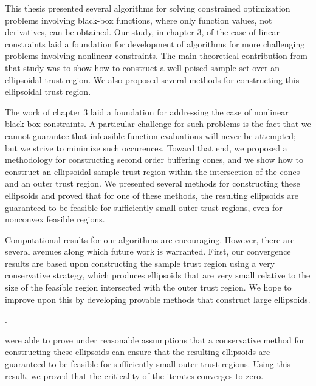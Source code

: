 This thesis presented several algorithms for solving constrained optimization problems involving black-box functions, where only function values, not derivatives, can be obtained.    Our study, in chapter 3, of the case of linear constraints laid 
a foundation for development of algorithms for more challenging problems involving nonlinear constraints.  
The main theoretical contribution from that study was to show how to construct a well-poised sample set over an ellipsoidal trust region.  We also proposed several methods for constructing this ellipsoidal trust region.

The work of chapter 3 laid a foundation for addressing the case of nonlinear black-box constraints.    A particular challenge for such problems is the fact that we cannot guarantee that infeasible function evaluations will never be attempted; but we strive to minimize such occurences.  Toward that end, we proposed a methodology for constructing second order buffering cones, and we show how to construct an ellipsoidal sample trust region within the intersection of the cones and an outer trust region.   We presented several methods for constructing these ellipsoids and proved that for one of these methods, the resulting ellipsoids are guaranteed to be feasible for sufficiently small outer trust regions, even for nonconvex feasible regions.  

Computational results for our algorithms are encouraging.  However, there are several avenues along which future work is warranted.    First, our convergence results are based upon constructing the sample trust region using a very conservative strategy, which produces ellipsoids that are very small relative to the size of the feasible region intersected with the outer trust region.  We hope to improve upon this by developing provable methods that construct large ellipsoids.

.




were able to prove under reasonable assumptions that a conservative method for constructing these ellipsoids can ensure that the resulting ellipsoids are guaranteed to be feasible for sufficiently small outer trust regions.  Using this result, we proved that the criticality of the iterates converges to zero.  


